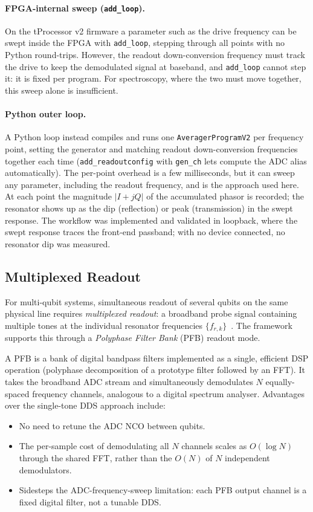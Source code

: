 \paragraph{FPGA-internal sweep (\texttt{add\_loop}).}
On the tProcessor v2 firmware a parameter such as the drive frequency can be swept
inside the FPGA with \texttt{add\_loop}, stepping through all points with no Python
round-trips.  However, the readout down-conversion frequency must track the drive to
keep the demodulated signal at baseband, and \texttt{add\_loop} cannot step it: it is
fixed per program.  For spectroscopy, where the two must move together, this sweep
alone is insufficient.

\paragraph{Python outer loop.}
A Python loop instead compiles and runs one \texttt{AveragerProgramV2} per frequency
point, setting the generator and matching readout down-conversion frequencies
together each time (\texttt{add\_readoutconfig} with \texttt{gen\_ch} lets \QICK{}
compute the ADC alias automatically).  The per-point overhead is a few milliseconds,
but it can sweep any parameter, including the readout frequency, and is the approach
used here.  At each point the magnitude $|I + jQ|$ of the accumulated phasor is
recorded; the resonator shows up as the dip (reflection) or peak (transmission) in
the swept response.  The workflow was implemented and validated in loopback, where
the swept response traces the front-end passband; with no device connected, no
resonator dip was measured.

\subsection{Multiplexed Readout}
\label{subsec:multiplex}

For multi-qubit systems, simultaneous readout of several qubits on the same
physical line requires \emph{multiplexed readout}: a broadband probe signal
containing multiple tones at the individual resonator frequencies $\{f_{r,k}\}$~\cite{Heinsoo2018,Walter2017}.
The \QICK{} framework supports this through a \emph{Polyphase Filter Bank} (PFB)
readout mode.

A PFB is a bank of digital bandpass filters implemented as a single, efficient DSP
operation (polyphase decomposition of a prototype filter followed by an FFT).  It
takes the broadband ADC stream and simultaneously demodulates $N$ equally-spaced
frequency channels, analogous to a digital spectrum analyser.  Advantages over
the single-tone DDS approach include:
\begin{itemize}
  \item No need to retune the ADC NCO between qubits.
  \item The per-sample cost of demodulating all $N$ channels scales as $O(\log N)$
        through the shared FFT, rather than the $O(N)$ of $N$ independent
        demodulators.
  \item Sidesteps the ADC-frequency-sweep limitation: each PFB output channel is
        a fixed digital filter, not a tunable DDS.
\end{itemize}

